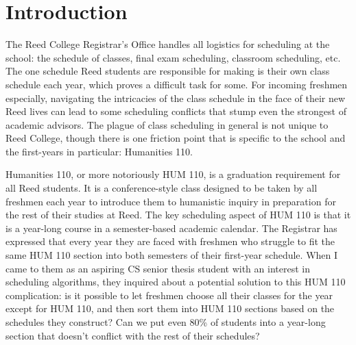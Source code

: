 
\chapter*{Introduction}

The Reed College Registrar’s Office handles all logistics for scheduling at the
school: the schedule of classes, final exam scheduling, classroom scheduling,
etc. The one schedule Reed students are responsible for making is their own
class schedule each year, which proves a difficult task for some. For incoming
freshmen especially, navigating the intricacies of the class schedule in the
face of their new Reed lives can lead to some scheduling conflicts that stump
even the strongest of academic advisors. The plague of class scheduling in
general is not unique to Reed College, though there is one friction point that
is specific to the school and the first-years in particular: Humanities 110.

Humanities 110, or more notoriously HUM 110, is a graduation requirement for all
Reed students. It is a conference-style class designed to be taken by all
freshmen each year to introduce them to humanistic inquiry in preparation for
the rest of their studies at Reed. The key scheduling aspect of HUM 110 is that
it is a year-long course in a semester-based academic calendar. The Registrar
has expressed that every year they are faced with freshmen who struggle to fit
the same HUM 110 section into both semesters of their first-year schedule. When
I came to them as an aspiring CS senior thesis student with an interest in
scheduling algorithms, they inquired about a potential solution to this HUM 110
complication: is it possible to let freshmen choose all their classes for the
year except for HUM 110, and then sort them into HUM 110 sections based on the
schedules they construct? Can we put even 80\% of students into a year-long
section that doesn’t conflict with the rest of their schedules?

